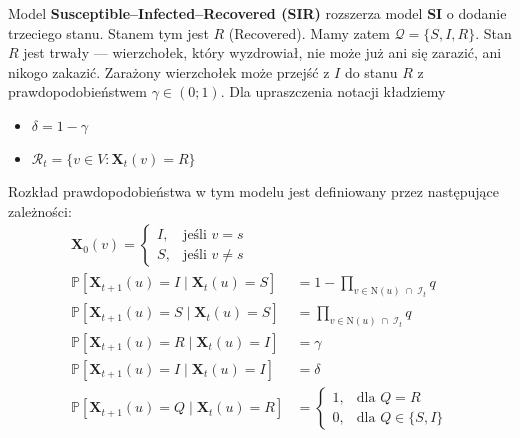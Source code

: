 Model \textbf{Susceptible--Infected--Recovered (SIR)} rozszerza model \textbf{SI} o dodanie trzeciego stanu. Stanem tym jest $R$ (Recovered). Mamy zatem $\mathcal{Q} = \{S, I, R\}$.
Stan $R$ jest trwały — wierzchołek, który wyzdrowiał, nie może już ani się zarazić, ani nikogo zakazić. Zarażony wierzchołek może przejść z $I$ do stanu $R$ z prawdopodobieństwem $\gamma \in (0;1)$. Dla upraszczenia notacji kładziemy 
\begin{itemize}
    \item $\delta=1-\gamma$
    \item $\mathcal{R}_t=\{v\in V: \mathbf{X}_t(v) = R\}$
\end{itemize}
Rozkład prawdopodobieństwa w tym modelu jest definiowany przez następujące zależności:
\[
\begin{aligned}
\mathbf{X}_0(v) =
\begin{cases}
I, & \text{jeśli } v = s \\[4pt]
S, & \text{jeśli } v \neq s
\end{cases} \\
\mathbb{P}[\mathbf{X}_{t+1}(u) = I \mid \mathbf{X}_t(u) = S]
 &= 1 - \prod_{v \in \mathrm{N}(u) \;\cap\; \mathcal{I}_t} q \\[6pt]
\mathbb{P}[\mathbf{X}_{t+1}(u) = S \mid \mathbf{X}_t(u) = S]
 &= \prod_{v \in \mathrm{N}(u) \;\cap\; \mathcal{I}_t} q \\[6pt]
\mathbb{P}[\mathbf{X}_{t+1}(u) = R \mid \mathbf{X}_t(u) = I]
 &= \gamma \\[6pt]
\mathbb{P}[\mathbf{X}_{t+1}(u) = I \mid \mathbf{X}_t(u) = I]
 &= \delta \\[6pt]
\mathbb{P}[\mathbf{X}_{t+1}(u) = Q \mid \mathbf{X}_t(u) = R]
 &= 
\begin{cases}
1, & \text{dla } Q = R \\[4pt]
0, & \text{dla } Q \in \{S, I\}
\end{cases}
\end{aligned}
\]

